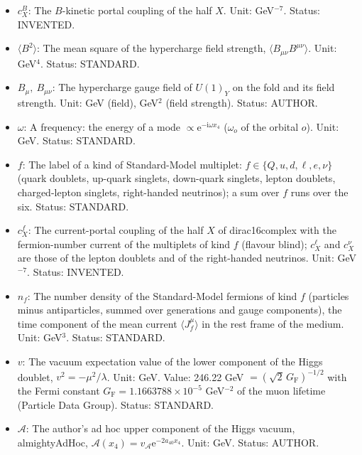\documentclass[
  10pt,
]{article}
\begin{document}
\begin{itemize}
  (field), GeV\(^2\) (field strength). Status: AUTHOR.
\item
  \(c^{B}_X\): The \(B\)-kinetic portal coupling of the half \(X\).
  Unit: GeV\(^{-7}\). Status: INVENTED.
\item
  \(\langle B^2\rangle\): The mean square of the hypercharge field
  strength, \(\langle B_{\mu\nu}B^{\mu\nu}\rangle\). Unit: GeV\(^4\).
  Status: STANDARD.
\item
  \(B_\mu,\ B_{\mu\nu}\): The hypercharge gauge field of \(U(1)_Y\) on
  the fold and its field strength. Unit: GeV (field), GeV\(^2\) (field
  strength). Status: AUTHOR.
\item
  \(\omega\): A frequency: the energy of a mode
  \(\propto \mathrm{e}^{-\mathrm{i}\omega x_4}\) (\(\omega_o\) of the
  orbital \(o\)). Unit: GeV. Status: STANDARD.
\item
  \(f\): The label of a kind of Standard-Model multiplet:
  \(f \in \{Q, u, d, \ell, e, \nu\}\) (quark doublets, up-quark
  singlets, down-quark singlets, lepton doublets, charged-lepton
  singlets, right-handed neutrinos); a sum over \(f\) runs over the six.
  Status: STANDARD.
\item
  \(c^{f}_X\): The current-portal coupling of the half \(X\) of
  dirac16complex with the fermion-number current of the multiplets of
  kind \(f\) (flavour blind); \(c^{\ell}_X\) and \(c^{\nu}_X\) are those
  of the lepton doublets and of the right-handed neutrinos. Unit:
  GeV\(^{-7}\). Status: INVENTED.
\item
  \(n_f\): The number density of the Standard-Model fermions of kind
  \(f\) (particles minus antiparticles, summed over generations and
  gauge components), the time component of the mean current
  \(\langle J_f^\mu\rangle\) in the rest frame of the medium. Unit:
  GeV\(^3\). Status: STANDARD.
\item
  \(v\): The vacuum expectation value of the lower component of the
  Higgs doublet, \(v^2 = -\mu^2/\lambda\). Unit: GeV. Value: 246.22 GeV
  \(= (\sqrt2\,G_{\mathrm{F}})^{-1/2}\) with the Fermi constant
  \(G_{\mathrm{F}} = 1.1663788\times10^{-5}\) GeV\(^{-2}\) of the muon
  lifetime (Particle Data Group). Status: STANDARD.
\item
  \(\mathcal{A}\): The author's ad hoc upper component of the Higgs
  vacuum, almightyAdHoc,
  \(\mathcal{A}(x_4) = v_{\mathcal{A}}\mathrm{e}^{-2a_{40}x_4}\). Unit:
  GeV. Status: AUTHOR.
\end{itemize}
\end{document}
